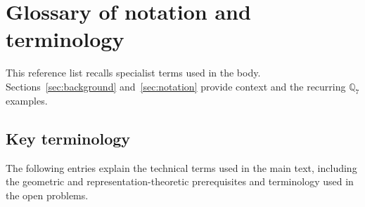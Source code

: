\documentclass[12pt, letterpaper]{article}
\numberwithin{equation}{section}
\theoremstyle{definition}
\theoremstyle{remark}
\begin{document}
\section*{Glossary of notation and terminology}

This reference list recalls specialist terms used in the body. Sections~\ref{sec:background} and~\ref{sec:notation} provide context and the recurring $\mathbb{Q}_7$ examples.

\subsection*{Key terminology}
The following entries explain the technical terms used in the main text, including the geometric and representation-theoretic prerequisites and terminology used in the open problems.
\end{document}

